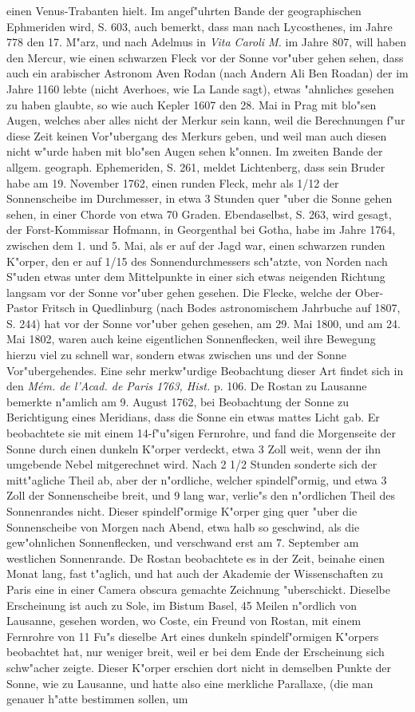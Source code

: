 \documentclass[a4paper, 11pt, oneside, polutonikogreek, german]{article}
\begin{document}
einen Venus-Trabanten hielt. Im angef"uhrten Bande der geographischen Ephmeriden wird, S. 603, auch bemerkt, dass man nach Lycosthenes, im Jahre 778 den 17. M"arz, und nach Adelmus in \emph{Vita Caroli M.} im Jahre 807, will haben den Mercur, wie einen schwarzen Fleck vor der Sonne vor"uber gehen sehen, dass auch ein arabischer Astronom Aven Rodan (nach Andern Ali Ben Roadan) der im Jahre 1160 lebte (nicht Averhoes, wie La Lande sagt), etwas "ahnliches gesehen zu haben glaubte, so wie auch Kepler 1607 den 28. Mai in Prag mit blo"sen Augen, welches aber alles nicht der Merkur sein kann, weil die Berechnungen f"ur diese Zeit keinen Vor"ubergang des Merkurs geben, und weil man auch diesen nicht w"urde haben mit blo"sen Augen sehen k"onnen. Im zweiten Bande der allgem. geograph. Ephemeriden, S. 261, meldet Lichtenberg, dass sein Bruder habe am 19. November 1762, einen runden Fleck, mehr als 1/12 der Sonnenscheibe im Durchmesser, in etwa 3 Stunden quer "uber die Sonne gehen sehen, in einer Chorde von etwa 70 Graden. Ebendaselbst, S. 263, wird gesagt, der Forst-Kommissar Hofmann, in Georgenthal bei Gotha, habe im Jahre 1764, zwischen dem 1. und 5. Mai, als er auf der Jagd war, einen schwarzen runden K"orper, den er auf 1/15 des Sonnendurchmessers sch"atzte, von Norden nach S"uden etwas unter dem Mittelpunkte in einer sich etwas neigenden Richtung langsam vor der Sonne vor"uber gehen gesehen. Die Flecke, welche der Ober-Pastor Fritsch in Quedlinburg (nach Bodes astronomischem Jahrbuche auf 1807, S. 244) hat vor der Sonne vor"uber gehen gesehen, am 29. Mai 1800, und am 24. Mai 1802, waren auch keine eigentlichen Sonnenflecken, weil ihre Bewegung hierzu viel zu schnell war, sondern etwas zwischen uns und der Sonne Vor"ubergehendes. Eine sehr merkw"urdige Beobachtung dieser Art findet sich in den \emph{Mém. de l'Acad. de Paris 1763, Hist.} p. 106. De Rostan zu Lausanne bemerkte n"amlich am 9. August 1762, bei Beobachtung der Sonne zu Berichtigung eines Meridians, dass die Sonne ein etwas mattes Licht gab. Er beobachtete sie mit einem 14-f"u"sigen Fernrohre, und fand die Morgenseite der Sonne durch einen dunkeln K"orper verdeckt, etwa 3 Zoll weit, wenn der ihn umgebende Nebel mitgerechnet wird. Nach 2 1/2 Stunden sonderte sich der mitt"agliche Theil ab, aber der n"ordliche, welcher spindelf"ormig, und etwa 3 Zoll der Sonnenscheibe breit, und 9 lang war, verlie"s den n"ordlichen Theil des Sonnenrandes nicht. Dieser spindelf"ormige K"orper ging quer "uber die Sonnenscheibe von Morgen nach Abend, etwa halb so geschwind, als die gew"ohnlichen Sonnenflecken, und verschwand erst am 7. September am westlichen Sonnenrande. De Rostan beobachtete es in der Zeit, beinahe einen Monat lang, fast t"aglich, und hat auch der Akademie der Wissenschaften zu Paris eine in einer Camera obscura gemachte Zeichnung "uberschickt. Dieselbe Erscheinung ist auch zu Sole, im Bistum Basel, 45 Meilen n"ordlich von Lausanne, gesehen worden, wo Coste, ein Freund von Rostan, mit einem Fernrohre von 11 Fu"s dieselbe Art eines dunkeln spindelf"ormigen K"orpers beobachtet hat, nur weniger breit, weil er bei dem Ende der Erscheinung sich schw"acher zeigte. Dieser K"orper erschien dort nicht in demselben Punkte der Sonne, wie zu Lausanne, und hatte also eine merkliche Parallaxe, (die man genauer h"atte bestimmen sollen, um 
\end{document}
